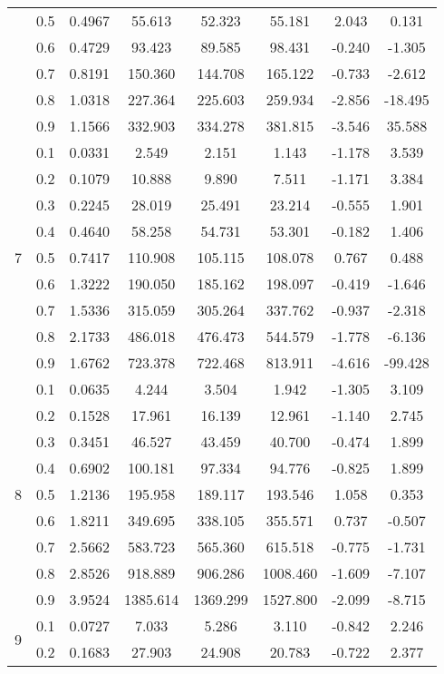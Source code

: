 \documentclass[11pt,a4paper]{report}
\begin{document}
\begin{longtable}{ | c | c || c | c | c | c | c | c | }
 & 0.5 & 0.4967 & 55.613 & 52.323 & 55.181 & 2.043 & 0.131 \\
 & 0.6 & 0.4729 & 93.423 & 89.585 & 98.431 & -0.240 & -1.305 \\
 & 0.7 & 0.8191 & 150.360 & 144.708 & 165.122 & -0.733 & -2.612 \\
 & 0.8 & 1.0318 & 227.364 & 225.603 & 259.934 & -2.856 & -18.495 \\
 & 0.9 & 1.1566 & 332.903 & 334.278 & 381.815 & -3.546 & 35.588 \\
 \hline
\multirow{9}{*}{7} & 0.1 & 0.0331 & 2.549 & 2.151 & 1.143 & -1.178 & 3.539 \\
 & 0.2 & 0.1079 & 10.888 & 9.890 & 7.511 & -1.171 & 3.384 \\
 & 0.3 & 0.2245 & 28.019 & 25.491 & 23.214 & -0.555 & 1.901 \\
 & 0.4 & 0.4640 & 58.258 & 54.731 & 53.301 & -0.182 & 1.406 \\
 & 0.5 & 0.7417 & 110.908 & 105.115 & 108.078 & 0.767 & 0.488 \\
 & 0.6 & 1.3222 & 190.050 & 185.162 & 198.097 & -0.419 & -1.646 \\
 & 0.7 & 1.5336 & 315.059 & 305.264 & 337.762 & -0.937 & -2.318 \\
 & 0.8 & 2.1733 & 486.018 & 476.473 & 544.579 & -1.778 & -6.136 \\
 & 0.9 & 1.6762 & 723.378 & 722.468 & 813.911 & -4.616 & -99.428 \\
 \hline
\multirow{9}{*}{8} & 0.1 & 0.0635 & 4.244 & 3.504 & 1.942 & -1.305 & 3.109 \\
 & 0.2 & 0.1528 & 17.961 & 16.139 & 12.961 & -1.140 & 2.745 \\
 & 0.3 & 0.3451 & 46.527 & 43.459 & 40.700 & -0.474 & 1.899 \\
 & 0.4 & 0.6902 & 100.181 & 97.334 & 94.776 & -0.825 & 1.899 \\
 & 0.5 & 1.2136 & 195.958 & 189.117 & 193.546 & 1.058 & 0.353 \\
 & 0.6 & 1.8211 & 349.695 & 338.105 & 355.571 & 0.737 & -0.507 \\
 & 0.7 & 2.5662 & 583.723 & 565.360 & 615.518 & -0.775 & -1.731 \\
 & 0.8 & 2.8526 & 918.889 & 906.286 & 1008.460 & -1.609 & -7.107 \\
 & 0.9 & 3.9524 & 1385.614 & 1369.299 & 1527.800 & -2.099 & -8.715 \\
 \hline
\multirow{9}{*}{9} & 0.1 & 0.0727 & 7.033 & 5.286 & 3.110 & -0.842 & 2.246 \\
 & 0.2 & 0.1683 & 27.903 & 24.908 & 20.783 & -0.722 & 2.377 \\

\end{longtable}
\end{document}
